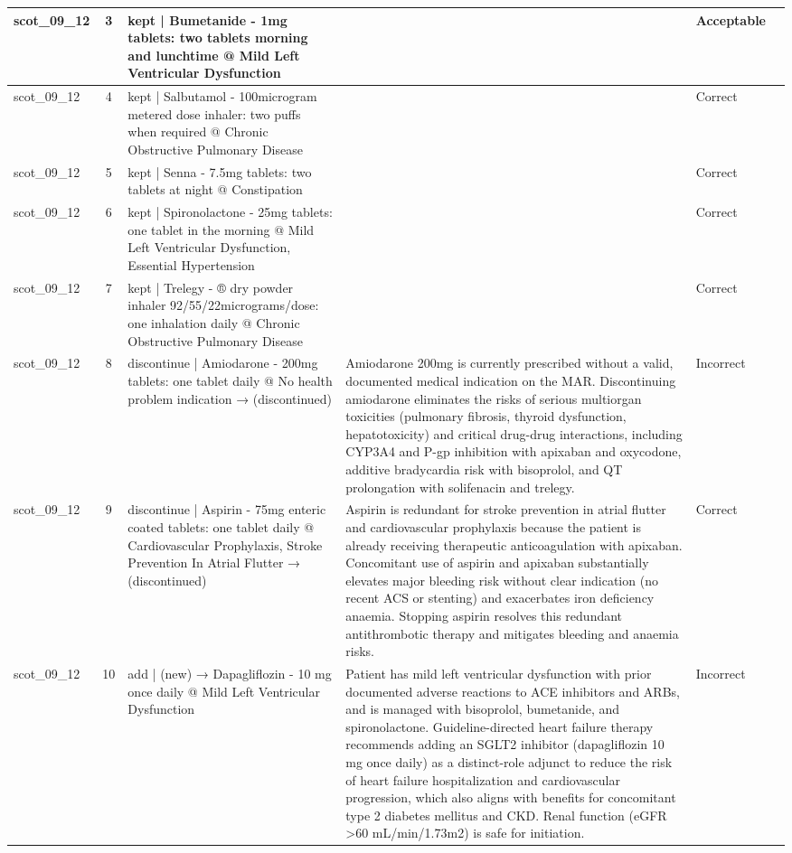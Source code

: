 \begin{longtable}{|p{1.45cm}|c|p{3.3cm}|p{6.5cm}|p{1.55cm}|p{2.3cm}|}
\hline
scot\_09\_12 & 3 & kept | Bumetanide - 1mg tablets: two tablets morning and lunchtime @ Mild Left Ventricular Dysfunction &  & Acceptable &  \\
\hline
scot\_09\_12 & 4 & kept | Salbutamol - 100microgram metered dose inhaler: two puffs when required @ Chronic Obstructive Pulmonary Disease &  & Correct &  \\
\hline
scot\_09\_12 & 5 & kept | Senna - 7.5mg tablets: two tablets at night @ Constipation &  & Correct &  \\
\hline
scot\_09\_12 & 6 & kept | Spironolactone - 25mg tablets: one tablet in the morning @ Mild Left Ventricular Dysfunction, Essential Hypertension &  & Correct &  \\
\hline
scot\_09\_12 & 7 & kept | Trelegy - ® dry powder inhaler 92/55/22micrograms/dose: one inhalation daily @ Chronic Obstructive Pulmonary Disease &  & Correct &  \\
\hline
scot\_09\_12 & 8 & discontinue | Amiodarone - 200mg tablets: one tablet daily @ No health problem indication → (discontinued) & Amiodarone 200mg is currently prescribed without a valid, documented medical indication on the MAR. Discontinuing amiodarone eliminates the risks of serious multiorgan toxicities (pulmonary fibrosis, thyroid dysfunction, hepatotoxicity) and critical drug-drug interactions, including CYP3A4 and P-gp inhibition with apixaban and oxycodone, additive bradycardia risk with bisoprolol, and QT prolongation with solifenacin and trelegy. & Incorrect &  \\
\hline
scot\_09\_12 & 9 & discontinue | Aspirin - 75mg enteric coated tablets: one tablet daily @ Cardiovascular Prophylaxis, Stroke Prevention In Atrial Flutter → (discontinued) & Aspirin is redundant for stroke prevention in atrial flutter and cardiovascular prophylaxis because the patient is already receiving therapeutic anticoagulation with apixaban. Concomitant use of aspirin and apixaban substantially elevates major bleeding risk without clear indication (no recent ACS or stenting) and exacerbates iron deficiency anaemia. Stopping aspirin resolves this redundant antithrombotic therapy and mitigates bleeding and anaemia risks. & Correct &  \\
\hline
scot\_09\_12 & 10 & add | (new) → Dapagliflozin - 10 mg once daily @ Mild Left Ventricular Dysfunction & Patient has mild left ventricular dysfunction with prior documented adverse reactions to ACE inhibitors and ARBs, and is managed with bisoprolol, bumetanide, and spironolactone. Guideline-directed heart failure therapy recommends adding an SGLT2 inhibitor (dapagliflozin 10 mg once daily) as a distinct-role adjunct to reduce the risk of heart failure hospitalization and cardiovascular progression, which also aligns with benefits for concomitant type 2 diabetes mellitus and CKD. Renal function (eGFR >60 mL/min/1.73m2) is safe for initiation. & Incorrect &  \\

\end{longtable}
